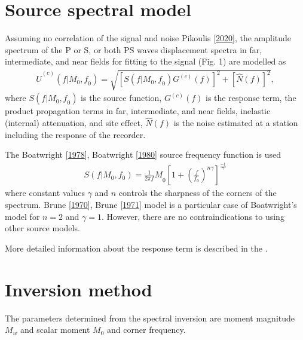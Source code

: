 \documentclass[letterpaper,10pt,english]{sphinxmanual}
\begin{document}
\section{Source spectral model}
\label{\detokenize{description:source-spectral-model}}
\sphinxAtStartPar
Assuming no correlation of the signal and noise Pikoulis  {[}\hyperlink{cite.bibliography:id6}{2020}{]},
the amplitude spectrum of the P or S, or both PS waves displacement spectra
in far, intermediate, and near fields for fitting to the signal (Fig. 1)
are modelled as
\begin{equation*}
\begin{split}{\hat{U}}^{(c)}\left(f|M_0{,f}_0\right)=
\sqrt{\left[S\left(f|M_0{,f}_0\right)G^{(c)}\left(f\right)\right]^2
+\left[\hat{N}\left(f\right)\right]^2},\end{split}
\end{equation*}
\sphinxAtStartPar
where \(S\left(f|M_0{,f}_0\right)\) is the source function,
\(G^{(c)}\left(f\right)\) is the response term,
the product propagation terms in far, intermediate, and near fields,
inelastic (internal) attenuation, and site effect,
\(\hat{N}\left(f\right)\) is the noise estimated at a station including
the response of the recorder.

\sphinxAtStartPar
The Boatwright {[}\hyperlink{cite.bibliography:id2}{1978}{]}, Boatwright {[}\hyperlink{cite.bibliography:id3}{1980}{]} source frequency function is used
\begin{equation*}
\begin{split}S\left(f|M_0,f_0\right)=
{{\frac{1}{2\pi f}M}_0\left[{1+\left(\frac{f}{f_0}\right)}^{n\gamma}\right]}^\frac{-1}{\gamma}\end{split}
\end{equation*}
\sphinxAtStartPar
where constant values \(\gamma\) and \(n\) controls the sharpness of the corners of the spectrum.
Brune {[}\hyperlink{cite.bibliography:id4}{1970}{]}, Brune {[}\hyperlink{cite.bibliography:id5}{1971}{]} model is a particular case of Boatwright’s model
for \(n=2\) and \(\gamma=1\).
However, there are no contraindications to using other source models.

\sphinxAtStartPar
More detailed information about the response term is described in the {\hyperref[\detokenize{api_main:api-main}]{}}.


\section{Inversion method}
\label{\detokenize{description:inversion-method}}\label{\detokenize{description:id6}}
\sphinxAtStartPar
The parameters determined from the spectral inversion are moment magnitude \(M_w\) and scalar moment  \(M_0\)
and corner frequency.
\end{document}
